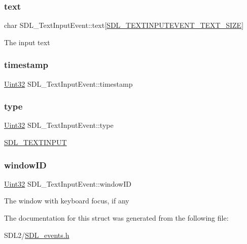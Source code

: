 \subsubsection{\texorpdfstring{text}{text}}
{\footnotesize\ttfamily char S\+D\+L\+\_\+\+Text\+Input\+Event\+::text\mbox{[}\hyperlink{_s_d_l__events_8h_a43822437fd5e89c1da1841a813cad4aa}{S\+D\+L\+\_\+\+T\+E\+X\+T\+I\+N\+P\+U\+T\+E\+V\+E\+N\+T\+\_\+\+T\+E\+X\+T\+\_\+\+S\+I\+ZE}\mbox{]}}

The input text \mbox{\label{struct_s_d_l___text_input_event_a20b190a96494918690ea7f99187be948}} 
\subsubsection{\texorpdfstring{timestamp}{timestamp}}
{\footnotesize\ttfamily \hyperlink{_s_d_l__stdinc_8h_add440eff171ea5f55cb00c4a9ab8672d}{Uint32} S\+D\+L\+\_\+\+Text\+Input\+Event\+::timestamp}

\mbox{\label{struct_s_d_l___text_input_event_a90576be2ea52e694deff40d0586654f5}} 
\subsubsection{\texorpdfstring{type}{type}}
{\footnotesize\ttfamily \hyperlink{_s_d_l__stdinc_8h_add440eff171ea5f55cb00c4a9ab8672d}{Uint32} S\+D\+L\+\_\+\+Text\+Input\+Event\+::type}

\hyperlink{_s_d_l__events_8h_a3b589e89be6b35c02e0dd34a55f3fccaa4fa2570088f6b9cbd109ae91b511368f}{S\+D\+L\+\_\+\+T\+E\+X\+T\+I\+N\+P\+UT} \mbox{\label{struct_s_d_l___text_input_event_aeb4f7a939353990ca40261ffbfbeb3d0}} 
\subsubsection{\texorpdfstring{window\+ID}{windowID}}
{\footnotesize\ttfamily \hyperlink{_s_d_l__stdinc_8h_add440eff171ea5f55cb00c4a9ab8672d}{Uint32} S\+D\+L\+\_\+\+Text\+Input\+Event\+::window\+ID}

The window with keyboard focus, if any 

The documentation for this struct was generated from the following file\+:\begin{DoxyCompactItemize}
\item 
S\+D\+L2/\hyperlink{_s_d_l__events_8h}{S\+D\+L\+\_\+events.\+h}\end{DoxyCompactItemize}

